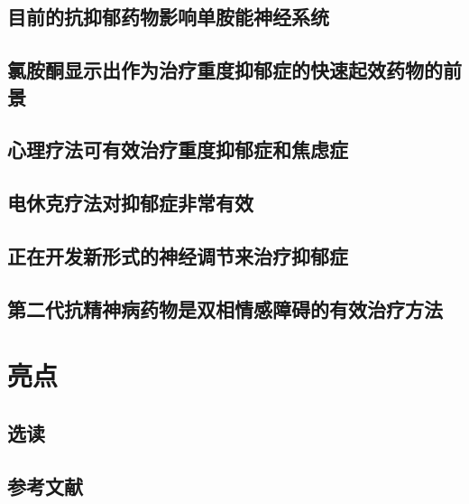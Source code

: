 \subsection{目前的抗抑郁药物影响单胺能神经系统}
\subsection{氯胺酮显示出作为治疗重度抑郁症的快速起效药物的前景}
\subsection{心理疗法可有效治疗重度抑郁症和焦虑症}
\subsection{电休克疗法对抑郁症非常有效}
\subsection{正在开发新形式的神经调节来治疗抑郁症}
\subsection{第二代抗精神病药物是双相情感障碍的有效治疗方法}

\section{亮点}
\subsection{选读}
\subsection{参考文献}


